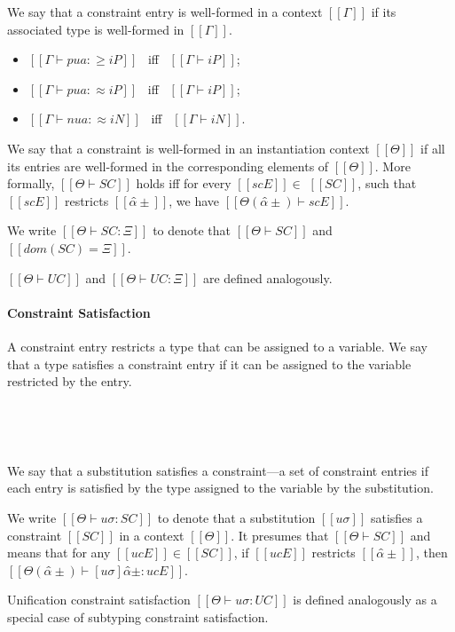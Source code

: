 \begin{definition}
  We say that a constraint entry is well-formed in a context $[[Γ]]$ if
  its associated type is well-formed in $[[Γ]]$.
  \begin{itemize}
    \item[] $[[Γ ⊢ pua :≥ iP]]$ ~iff~ $[[Γ ⊢ iP]]$;
    \item[] $[[Γ ⊢ pua :≈ iP]]$ ~iff~ $[[Γ ⊢ iP]]$;
    \item[] $[[Γ ⊢ nua :≈ iN]]$ ~iff~ $[[Γ ⊢ iN]]$.
  \end{itemize}
\end{definition}


\begin{definition}
  We say that a constraint is well-formed in an 
  instantiation context $[[Θ]]$ if all its entries are well-formed in
  the corresponding elements of $[[Θ]]$.
  More formally, 
  $[[Θ ⊢ SC]]$ holds iff for every $[[scE]] \in $ $[[SC]]$,
  such that $[[scE]]$ restricts $[[α̂±]]$,
  we have $[[Θ(α̂±) ⊢ scE]]$.

  We write $[[Θ ⊢ SC : Ξ]]$ to denote
  that $[[Θ ⊢ SC]]$ and $[[dom(SC) = Ξ]]$.

  $[[Θ ⊢ UC]]$ and $[[Θ ⊢ UC : Ξ]]$ are defined analogously.
\end{definition}


\paragraph{Constraint Satisfaction}

A constraint entry restricts a type that can be assigned to a variable.
We say that a type satisfies a constraint entry if it can be assigned
to the variable restricted by the entry.

\begin{definition}
  \hfill\\
  \begin{multicols}{2}
  \ottdefnSATSCENLabeled[\apppref]{}
  \columnbreak\\
  \ottdefnSATSCEPLabeled[\apppref]{}
  \end{multicols}
\end{definition}

We say that a substitution satisfies a constraint---a set of constraint 
entries if each entry is satisfied by the type assigned to the variable
by the substitution. 

\begin{definition}
  We write $[[Θ ⊢ uσ : SC]]$ to denote that
  a substitution $[[uσ]]$ satisfies a constraint $[[SC]]$ in a context $[[Θ]]$.
  It presumes that $[[Θ ⊢ SC]]$ and 
   means that for any $[[ucE]] \in [[SC]]$, if $[[ucE]]$ restricts $[[α̂±]]$,
  then $[[Θ(α̂±) ⊢ [uσ]α̂± : ucE]]$.


  Unification constraint satisfaction $[[Θ ⊢ uσ : UC]]$ 
  is defined analogously as a special case of subtyping constraint satisfaction.

\end{definition}


